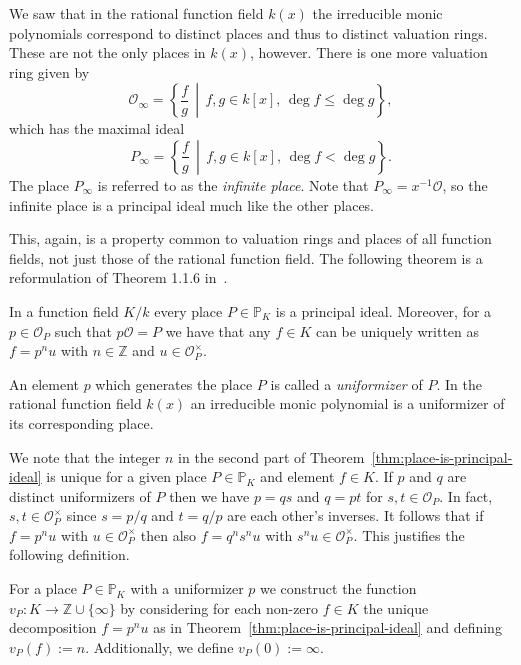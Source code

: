 We saw that in the rational function field \(k(x)\) the irreducible monic polynomials correspond to distinct places and thus to distinct valuation rings. These are not the only places in \(k(x)\), however. There is one more valuation ring given by
\[\mathcal{O}_{\infty} = \left\{ \frac{f}{g} \,\middle|\, f,g \in k[x] ,\, \deg{f} \leq \deg{g} \right\},\]
which has the maximal ideal
\[P_{\infty} = \left\{ \frac{f}{g} \,\middle|\, f,g \in k[x] ,\, \deg{f} < \deg{g} \right\}.\]
The place \(P_{\infty}\) is referred to as the \textit{infinite place}. Note that \(P_{\infty} = x^{-1}\mathcal{O}\), so the infinite place is a principal ideal much like the other places.

This, again, is a property common to valuation rings and places of all function fields, not just those of the rational function field. The following theorem is a reformulation of Theorem 1.1.6 in~\cite{stichtenoth-2009-algebraic-function-fields}.

\begin{theorem}%
  \label{thm:place-is-principal-ideal}
  In a function field \(K / k\) every place \(P \in \mathbb{P}_{K}\) is a principal ideal. Moreover, for a \(p \in \mathcal{O}_{P}\) such that \(p\mathcal{O} = P\) we have that any \(f \in K\) can be uniquely written as \(f = p^{n}u\) with \(n \in \mathbb{Z}\) and \(u \in \mathcal{O}_{P}^{\times}\).
\end{theorem}

An element \(p\) which generates the place \(P\) is called a \textit{uniformizer} of \(P\). In the rational function field \(k(x)\) an irreducible monic polynomial is a uniformizer of its corresponding place.

We note that the integer \(n\) in the second part of Theorem~\ref{thm:place-is-principal-ideal} is unique for a given place \(P \in \mathbb{P}_{K}\) and element \(f \in K\). If \(p\) and \(q\) are distinct uniformizers of \(P\) then we have \(p = qs\) and \(q = pt\) for \(s,t \in \mathcal{O}_{P}\). In fact, \(s,t \in \mathcal{O}_{P}^{\times}\) since \(s = p/q\) and \(t = q/p\) are each other's inverses. It follows that if \(f = p^{n}u\) with \(u \in \mathcal{O}_{P}^{\times}\) then also \(f = q^{n}s^{n}u\) with \(s^{n}u \in \mathcal{O}_{P}^{\times}\). This justifies the following definition.

\begin{definition}%
  \label{def:valuation}
  For a place \(P \in \mathbb{P}_{K}\) with a uniformizer \(p\) we construct the function \(v_{P} : K \to \mathbb{Z} \cup \{\infty\}\) by considering for each non-zero \(f \in K\) the unique decomposition \(f = p^{n}u\) as in Theorem~\ref{thm:place-is-principal-ideal} and defining \(v_{P}(f) := n\). Additionally, we define \({v_{P}(0) := \infty}\).
\end{definition}

